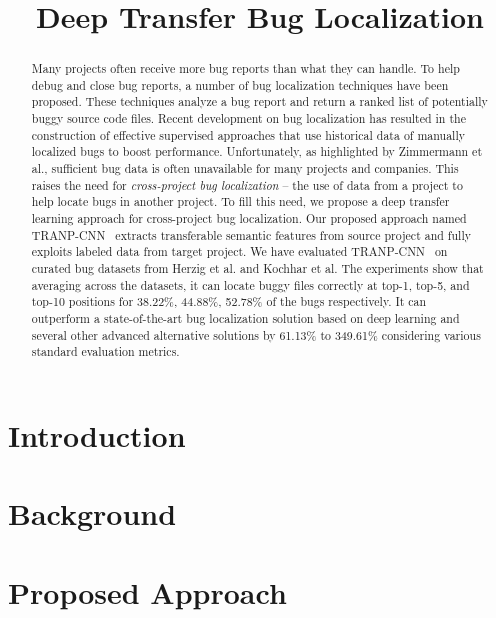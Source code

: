 \documentclass[sigconf]{acmart}
\newcommand{\TRANPCNN}{TRANP-CNN }
\begin{document}
\title{Deep Transfer Bug Localization}

\begin{abstract}
Many projects often receive more bug reports than what they can handle. To help debug and close bug reports, a number of bug localization techniques have been proposed. These techniques analyze a bug report and return a ranked list of potentially buggy source code files. Recent development on bug localization has resulted in the construction of effective supervised approaches that use historical data of manually localized bugs to boost performance. Unfortunately, as highlighted by Zimmermann et al., sufficient bug data is often unavailable for many projects and companies. This raises the need for {\em cross-project bug localization} -- the use of data from a project to help locate bugs in another project. To fill this need, we propose a deep transfer learning approach for cross-project bug localization. Our proposed approach named \TRANPCNN\ extracts transferable semantic features from source project and fully exploits labeled data from target project. We have evaluated \TRANPCNN\ on curated bug datasets from Herzig et al. and Kochhar et al. The experiments show that averaging across the datasets, it can locate buggy files correctly at top-1, top-5, and top-10 positions for 38.22\%, 44.88\%, 52.78\% of the bugs respectively. It can outperform a state-of-the-art bug localization solution based on deep learning and several other advanced alternative solutions by 61.13\% to 349.61\% considering various standard evaluation metrics.
\end{abstract}

\maketitle

\section{Introduction}\label{sec.intro}


\section{Background}\label{sec.background}


\section{Proposed Approach}\label{sec.approach}

\end{document}
